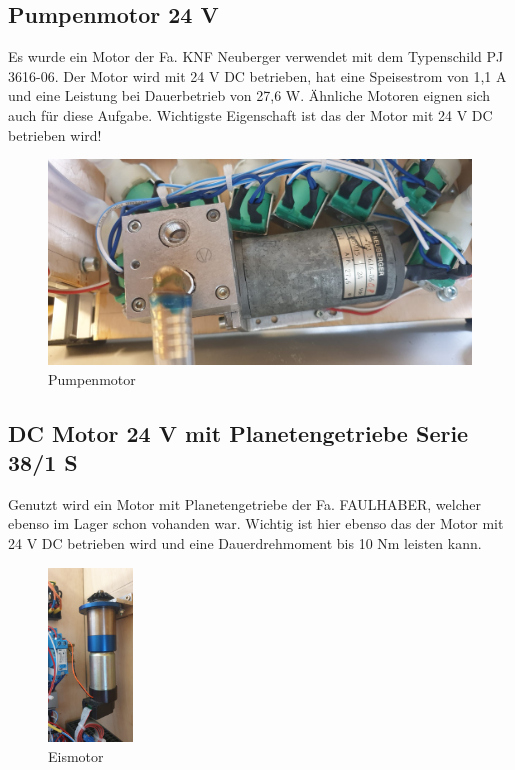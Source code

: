 \documentclass[10pt,a4paper]{report}
\begin{document}
	\subsection{Pumpenmotor 24 V}
	Es wurde ein Motor der Fa. KNF Neuberger verwendet mit dem Typenschild PJ 3616-06. Der Motor wird mit 24 V DC betrieben, hat eine Speisestrom von 1,1 A und eine Leistung bei Dauerbetrieb von 27,6 W. Ähnliche Motoren eignen sich auch für diese Aufgabe. Wichtigste Eigenschaft ist das der Motor mit 24 V DC betrieben wird!\\
	\begin{figure}[htb]
		\includegraphics[width=1\textwidth]{Pumpenmotor}
		\centering
		\caption{Pumpenmotor}
	\end{figure} 
	\subsection{DC Motor 24 V mit Planetengetriebe Serie 38/1 S}
	Genutzt wird ein Motor mit Planetengetriebe der Fa. FAULHABER, welcher ebenso im Lager schon vohanden war. Wichtig ist hier ebenso das der Motor mit 24 V DC betrieben wird und eine Dauerdrehmoment bis 10 Nm leisten kann.\\
	\begin{figure}[htb]
		\includegraphics[width=0.2\textwidth]{Eismotor}
		\centering
		\caption{Eismotor}
	\end{figure} 
\end{document}
